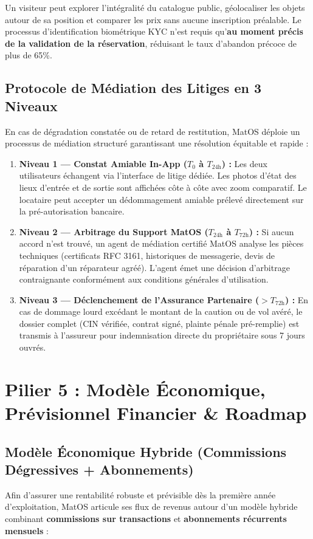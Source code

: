 \documentclass[11pt,a4paper]{report}
\begin{document}
Un visiteur peut explorer l'intégralité du catalogue public, géolocaliser les objets autour de sa position et comparer les prix sans aucune inscription préalable. Le processus d'identification biométrique KYC n'est requis qu'\textbf{au moment précis de la validation de la réservation}, réduisant le taux d'abandon précoce de plus de 65\%.

\section{Protocole de Médiation des Litiges en 3 Niveaux}
En cas de dégradation constatée ou de retard de restitution, MatOS déploie un processus de médiation structuré garantissant une résolution équitable et rapide :
\begin{enumerate}[leftmargin=*]
    \item \textbf{Niveau 1 --- Constat Amiable In-App ($T_0$ à $T_{24\text{h}}$) :} Les deux utilisateurs échangent via l'interface de litige dédiée. Les photos d'état des lieux d'entrée et de sortie sont affichées côte à côte avec zoom comparatif. Le locataire peut accepter un dédommagement amiable prélevé directement sur la pré-autorisation bancaire.
    \item \textbf{Niveau 2 --- Arbitrage du Support MatOS ($T_{24\text{h}}$ à $T_{72\text{h}}$) :} Si aucun accord n'est trouvé, un agent de médiation certifié MatOS analyse les pièces techniques (certificats RFC 3161, historiques de messagerie, devis de réparation d'un réparateur agréé). L'agent émet une décision d'arbitrage contraignante conformément aux conditions générales d'utilisation.
    \item \textbf{Niveau 3 --- Déclenchement de l'Assurance Partenaire ($> T_{72\text{h}}$) :} En cas de dommage lourd excédant le montant de la caution ou de vol avéré, le dossier complet (CIN vérifiée, contrat signé, plainte pénale pré-remplie) est transmis à l'assureur pour indemnisation directe du propriétaire sous 7 jours ouvrés.
\end{enumerate}

\chapter{Pilier 5 : Modèle Économique, Prévisionnel Financier \& Roadmap}

\section{Modèle Économique Hybride (Commissions Dégressives + Abonnements)}
Afin d'assurer une rentabilité robuste et prévisible dès la première année d'exploitation, MatOS articule ses flux de revenus autour d'un modèle hybride combinant \textbf{commissions sur transactions} et \textbf{abonnements récurrents mensuels} :
\end{document}
